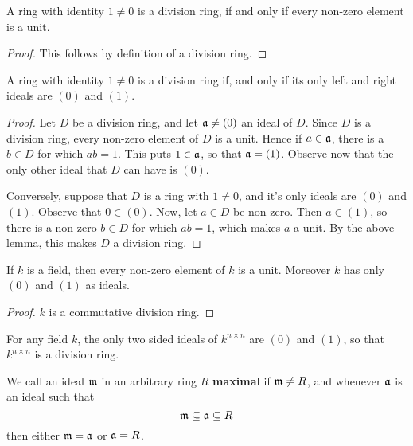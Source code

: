 \begin{lemma}\label{lemma_5.4.2}
  A ring with identity $1 \neq 0$ is a division ring, if and only if
  every non-zero element is a unit.
\end{lemma}
\begin{proof}
  This follows by definition of a division ring.
\end{proof}
\begin{corollary}
  A ring with identity $1 \neq 0$ is a division ring if, and only if
  its only left and right ideals are $(0)$ and $(1)$.
\end{corollary}
\begin{proof}
  Let $D$ be a division ring, and let $\mathfrak{a} \neq (0)$ an ideal of
  $D$. Since $D$ is a division ring, every non-zero element of $D$ is
  a unit. Hence if $a \in \mathfrak{a}$, there is a $b \in D$ for which $ab=1$.
  This puts $1 \in \mathfrak{a}$, so that $\mathfrak{a}=(1)$. Observe now that the only
  other ideal that $D$ can have is $(0)$.

  Conversely, suppose that $D$ is a ring with $1 \neq 0$, and it's
  only ideals are $(0)$ and $(1)$. Observe that $0 \in (0)$. Now, let
  $a \in D$ be non-zero. Then $a \in (1)$, so there is a non-zero $b
  \in D$ for which $ab=1$, which makes $a$ a unit. By the above lemma,
  this makes $D$ a division ring.
\end{proof}
\begin{corollary}
  If $k$ is a field, then every non-zero element of $k$ is a unit.
  Moreover $k$ has only $(0)$ and $(1)$ as ideals.
\end{corollary}
\begin{proof}
  $k$ is a commutative division ring.
\end{proof}

\begin{example}\label{example_5.14}
  For any field $k$, the only two sided ideals of $k^{n \times n}$ are $(0)$
  and $(1)$, so that $k^{n \times n}$ is a division ring.
\end{example}

\begin{definition}
  We call an ideal $\mathfrak{m}$ in an arbitrary ring $R$ \textbf{maximal} if
  $\mathfrak{m} \neq R$, and whenever $\mathfrak{a}$ is an ideal such that
  \begin{equation*}
    \mathfrak{m} \subseteq \mathfrak{a} \subseteq R
  \end{equation*}
  then either $\mathfrak{m}=\mathfrak{a}$ or $\mathfrak{a}=R$.
\end{definition}

